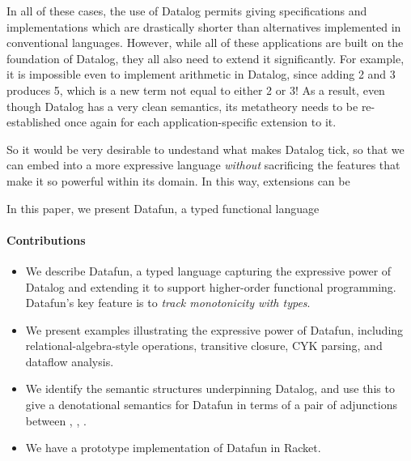 In all of these cases, the use of Datalog permits giving
specifications and implementations which are drastically shorter than
alternatives implemented in conventional languages. However, while all
of these applications are built on the foundation of Datalog, they all
also need to extend it significantly. For example, it is impossible
even to implement arithmetic in Datalog, since adding 2 and 3 produces
5, which is a new term not equal to either 2 or 3! As a result, even
though Datalog has a very clean semantics, its metatheory needs to be
re-established once again for each application-specific extension to
it.

So it would be very desirable to undestand what makes Datalog tick, so
that we can embed into a more expressive language \emph{without}
sacrificing the features that make it so powerful within its domain.
In this way, extensions can be

In this paper, we present Datafun, a typed functional language


\paragraph{Contributions}
\begin{itemize}
\item We describe Datafun, a typed language capturing the expressive power of
  Datalog and extending it to support higher-order functional programming.
  Datafun's key feature is to \emph{track monotonicity with types}.

\item We present examples illustrating the expressive power of Datafun,
  including relational-algebra-style operations, transitive closure, CYK
  parsing, and dataflow analysis.

\item We identify the semantic structures underpinning Datalog, and use this to
  give a denotational semantics for Datafun in terms of a pair of adjunctions
  between \cSet{}, \cPoset{}, \cSL{}.

\item We have a prototype implementation of Datafun in Racket. 
\end{itemize}



